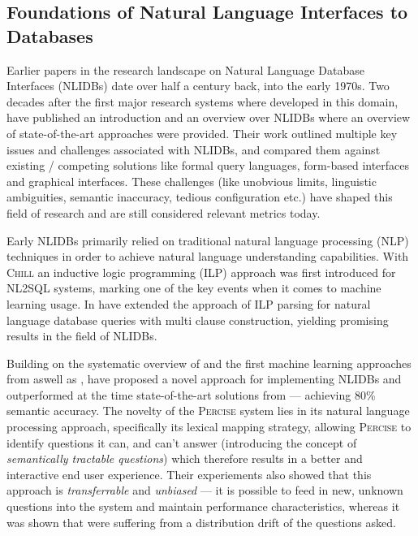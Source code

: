 \documentclass{article}
\begin{document}

\subsection{Foundations of Natural Language Interfaces to Databases}

Earlier papers in the research landscape on Natural Language Database Interfaces (NLIDBs) date over half
a century back, into the early 1970s. Two decades after the first major research systems where developed
in this domain, \citeauthor*{NLIDBs} have published an introduction and an overview over NLIDBs where an overview of
state-of-the-art approaches were provided. \citep{NLIDBs} Their work outlined multiple key issues and challenges
associated with NLIDBs, and compared them against existing / competing solutions like formal query languages,
form-based interfaces and graphical interfaces. These challenges (like unobvious limits, linguistic ambiguities,
semantic inaccuracy, tedious configuration etc.) have shaped this field of research and are still considered relevant
metrics today.

Early NLIDBs primarily relied on traditional natural language processing (NLP) techniques in order to achieve
natural language understanding capabilities. With \textsc{Chill} an inductive logic programming (ILP) approach
was first introduced for NL2SQL systems, marking one of the key events when it comes to machine learning usage.
\citep{ILPParsing} In \citeyear{ILPParsing2} \citeauthor*{ILPParsing2} have extended the approach of ILP
parsing for natural language database queries with multi clause construction, yielding promising results
in the field of NLIDBs. \citep{ILPParsing2}

Building on the systematic overview of \citeauthor*{NLIDBs} and the first machine learning approaches from
\citeauthor*{ILPParsing} aswell as \citeauthor*{ILPParsing2}, \citeauthor{NLIDBTheory} have proposed a novel 
approach for implementing NLIDBs and outperformed at the time state-of-the-art solutions from \cite{ILPParsing} 
\cite{ILPParsing2} — achieving 80\% semantic accuracy. \citep{NLIDBTheory} The novelty of the \textsc{Percise}
system lies in its natural language processing approach, specifically its lexical mapping strategy, allowing 
\textsc{Percise} to identify questions it can, and can't answer (introducing the concept of \textit{semantically 
tractable questions}) which therefore results in a better and interactive end user experience. Their experiements 
also showed that this approach is \textit{transferrable} and \textit{unbiased} — it is possible to feed in new, 
unknown questions into the system and maintain performance characteristics, whereas it was shown that 
\cite{ILPParsing} were suffering from a distribution drift of the questions asked. \citep{NLIDBTheory}
\end{document}
